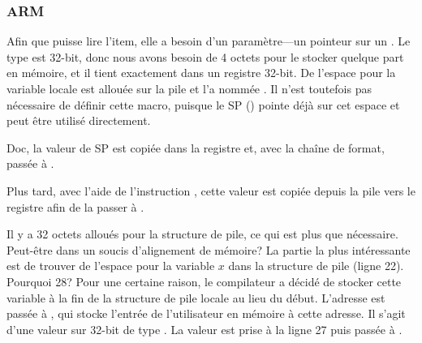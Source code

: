 \subsubsection{ARM}

\myparagraph{\OptimizingKeilVI (\ThumbMode)}



\myindex{\CLanguageElements!\Pointers}

Afin que \scanf puisse lire l'item, elle a besoin d'un paramètre---un pointeur sur un \Tint.
Le type \Tint est 32-bit, donc nous avons besoin de 4 octets pour le stocker quelque
part en mémoire, et il tient exactement dans un registre 32-bit.
De l'espace pour la variable locale  est allouée sur la pile et \IDA l'a
nommée . Il n'est toutefois pas nécessaire de définir cette macro, puisque
le \ac{SP} () pointe déjà sur cet espace et
peut être utilisé directement.

Doc, la valeur de \ac{SP} est copiée dans la registre  et, avec la chaîne
de format, passée à \scanf.



Plus tard, avec l'aide de l'instruction , cette valeur est copiée depuis
la pile vers le registre  afin de la passer à \printf.




Il y a 32 octets alloués pour la structure de pile, ce qui est plus que nécessaire.
Peut-être dans un soucis d'alignement de mémoire?
La partie la plus intéressante est de trouver de l'espace pour la variable $x$ dans
la structure de pile (ligne 22).
Pourquoi 28? Pour une certaine raison, le compilateur a décidé de stocker cette
variable à la fin de la structure de pile locale au lieu du début.
L'adresse est passée à \scanf, qui stocke l'entrée de l'utilisateur en mémoire à
cette adresse.
Il s'agit d'une valeur sur 32-bit de type \Tint.
La valeur est prise à la ligne 27 puis passée à \printf.

